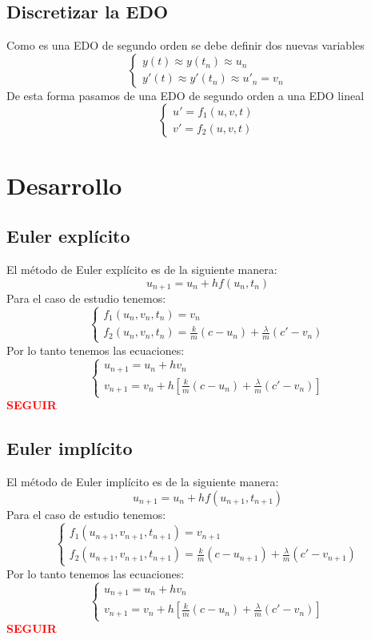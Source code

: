 \documentclass[12pt]{article}
\numberwithin{equation}{section}
\numberwithin{figure}{section}
\numberwithin{table}{section}
\begin{document}
\subsection{Discretizar la EDO}
Como es una EDO de segundo orden se debe definir dos nuevas variables
\[
\begin{cases}
    y(t) \approx y(t_n) \approx u_n \\
    y'(t) \approx y'(t_n) \approx u'_n = v_n 
\end{cases}
\]
De esta forma pasamos de una EDO de segundo orden a una EDO lineal
\[
\begin{cases}
    u' = f_1(u,v,t) \\
    v' = f_2(u,v,t)
\end{cases}
\]
\pagebreak
\section{Desarrollo}
\subsection{Euler explícito}
El método de Euler explícito es de la siguiente manera:
\begin{equation}
u_{n+1} = u_n + h f(u_n, t_n)    
\end{equation}
Para el caso de estudio tenemos:
\[
\begin{cases}
    f_1(u_n,v_n,t_n) = v_n \\
    f_2(u_n,v_n,t_n) = \frac{k}{m}(c - u_n) + \frac{\lambda}{m}(c' - v_n)
\end{cases}
\]
Por lo tanto tenemos las ecuaciones:
\[
\begin{cases}
    u_{n+1} = u_n+hv_n \\
    v_{n+1} = v_n + h [\frac{k}{m}(c - u_n) + \frac{\lambda}{m}(c' - v_n)]
\end{cases}
\]
\textcolor{red}{\textbf{SEGUIR}}
\subsection{Euler implícito}
El método de Euler implícito es de la siguiente manera:
\begin{equation}
u_{n+1} = u_n + h f(u_{n+1}, t_{n+1})
\end{equation}
Para el caso de estudio tenemos:
\[
\begin{cases}
    f_1(u_{n+1},v_{n+1},t_{n+1}) = v_{n+1} \\
    f_2(u_{n+1},v_{n+1},t_{n+1}) = \frac{k}{m}(c - u_{n+1}) + \frac{\lambda}{m}(c' - v_{n+1})
\end{cases}
\]
Por lo tanto tenemos las ecuaciones:
\[
\begin{cases}
    u_{n+1} = u_n+hv_n \\
    v_{n+1} = v_n + h [\frac{k}{m}(c - u_n) + \frac{\lambda}{m}(c' - v_n)]
\end{cases}
\]
\textcolor{red}{\textbf{SEGUIR}}
\end{document}
